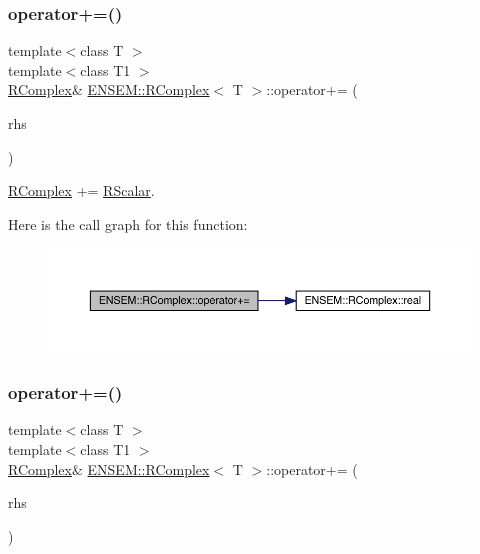 \subsubsection{\texorpdfstring{operator+=()}{operator+=()}\hspace{0.1cm}{\footnotesize\ttfamily [2/6]}}
{\footnotesize\ttfamily template$<$class T $>$ \\
template$<$class T1 $>$ \\
\mbox{\hyperlink{classENSEM_1_1RComplex}{R\+Complex}}\& \mbox{\hyperlink{classENSEM_1_1RComplex}{E\+N\+S\+E\+M\+::\+R\+Complex}}$<$ T $>$\+::operator+= (\begin{DoxyParamCaption}\item[{const \mbox{\hyperlink{classENSEM_1_1RScalar}{R\+Scalar}}$<$ T1 $>$ \&}]{rhs }\end{DoxyParamCaption})\hspace{0.3cm}{\ttfamily [inline]}}



\mbox{\hyperlink{classENSEM_1_1RComplex}{R\+Complex}} += \mbox{\hyperlink{classENSEM_1_1RScalar}{R\+Scalar}}. 

Here is the call graph for this function\+:
\nopagebreak
\begin{figure}[H]
\begin{center}
\leavevmode
\includegraphics[width=350pt]{d9/d0e/classENSEM_1_1RComplex_a0a7beaab81b8f5e2129a4c7b1074f85c_cgraph}
\end{center}
\end{figure}
\mbox{\label{classENSEM_1_1RComplex_a0a7beaab81b8f5e2129a4c7b1074f85c}} 
\subsubsection{\texorpdfstring{operator+=()}{operator+=()}\hspace{0.1cm}{\footnotesize\ttfamily [3/6]}}
{\footnotesize\ttfamily template$<$class T $>$ \\
template$<$class T1 $>$ \\
\mbox{\hyperlink{classENSEM_1_1RComplex}{R\+Complex}}\& \mbox{\hyperlink{classENSEM_1_1RComplex}{E\+N\+S\+E\+M\+::\+R\+Complex}}$<$ T $>$\+::operator+= (\begin{DoxyParamCaption}\item[{const \mbox{\hyperlink{classENSEM_1_1RScalar}{R\+Scalar}}$<$ T1 $>$ \&}]{rhs }\end{DoxyParamCaption})\hspace{0.3cm}{\ttfamily [inline]}}



